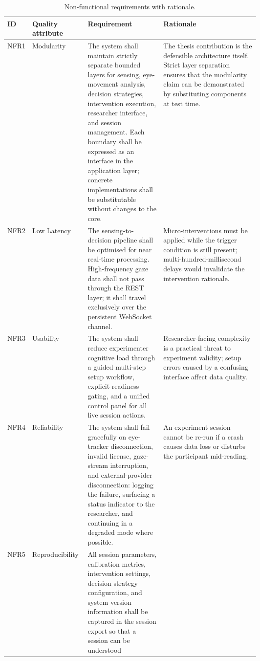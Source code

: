 \begin{table}[htbp]
\centering
\small
\caption{Non-functional requirements with rationale.}
\label{tab:nfr}
\begin{tabularx}{\linewidth}{%
  p{0.08\linewidth}
  p{0.22\linewidth}
  p{0.30\linewidth}
  X
}
\toprule
\textbf{ID} & \textbf{Quality attribute} & \textbf{Requirement} & \textbf{Rationale} \\
\midrule
NFR1 & Modularity &
  The system shall maintain strictly separate bounded layers for sensing,
  eye-movement analysis, decision strategies, intervention execution,
  researcher interface, and session management.
  Each boundary shall be expressed as an interface in the application layer;
  concrete implementations shall be substitutable without changes to the core. &
  The thesis contribution is the defensible architecture itself.
  Strict layer separation ensures that the modularity claim can be demonstrated
  by substituting components at test time. \\
\midrule
NFR2 & Low Latency &
  The sensing-to-decision pipeline shall be optimised for near real-time
  processing.
  High-frequency gaze data shall not pass through the REST layer; it shall
  travel exclusively over the persistent WebSocket channel. &
  Micro-interventions must be applied while the trigger condition is still
  present; multi-hundred-millisecond delays would invalidate the intervention
  rationale. \\
\midrule
NFR3 & Usability &
  The system shall reduce experimenter cognitive load through a guided
  multi-step setup workflow, explicit readiness gating, and a unified
  control panel for all live session actions. &
  Researcher-facing complexity is a practical threat to experiment validity;
  setup errors caused by a confusing interface affect data quality. \\
\midrule
NFR4 & Reliability &
  The system shall fail gracefully on eye-tracker disconnection, invalid
  license, gaze-stream interruption, and external-provider disconnection:
  logging the failure, surfacing a status indicator to the researcher,
  and continuing in a degraded mode where possible. &
  An experiment session cannot be re-run if a crash causes data loss or
  disturbs the participant mid-reading. \\
\midrule
NFR5 & Reproducibility &
  All session parameters, calibration metrics, intervention settings,
  decision-strategy configuration, and system version information shall
  be captured in the session export so that a session can be understood

\end{tabularx}
\end{table}

